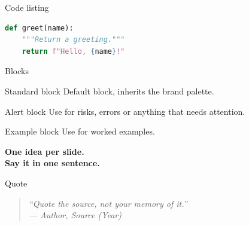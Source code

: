 \documentclass[10pt, aspectratio=169]{beamer}
\begin{document}
\begin{frame}[fragile]{Code listing}
    \begin{lstlisting}[language=Python, caption={Minimal example}]
def greet(name):
    """Return a greeting."""
    return f"Hello, {name}!"
    \end{lstlisting}
\end{frame}

\begin{frame}{Blocks}
    \begin{block}{Standard block}
        Default block, inherits the brand palette.
    \end{block}

    \begin{alertblock}{Alert block}
        Use for risks, errors or anything that needs attention.
    \end{alertblock}

    \begin{exampleblock}{Example block}
        Use for worked examples.
    \end{exampleblock}
\end{frame}

\begin{frame}[plain]
    \centering
    \vfill
    {\Huge\bfseries\color{BrandPrimary}
     One idea per slide.\\[0.3cm]
     Say it in one sentence.}
    \vfill
\end{frame}

\begin{frame}{Quote}
    \vspace{1cm}
    \begin{quote}
        \large\itshape
        ``Quote the source, not your memory of it.''\\[0.4cm]
        \normalsize\upshape --- Author, \textit{Source} (Year)
    \end{quote}
\end{frame}
\end{document}
